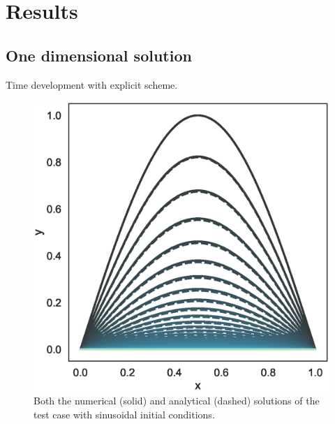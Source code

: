 \documentclass[aps,reprint]{revtex4-1}
\begin{document}
\section{Results} \label{sec:results}
\subsection{One dimensional solution}
Time development with explicit scheme.
\begin{figure}[ht]
  \centering
  \includegraphics[width=\columnwidth]{figures/sin_numeric_vs_analytical.eps}
  \caption{\label{fig:sinnumanalytic} Both the numerical (solid) and analytical
    (dashed) solutions of the test case with
    sinusoidal initial conditions. }
\end{figure}
\end{document}
